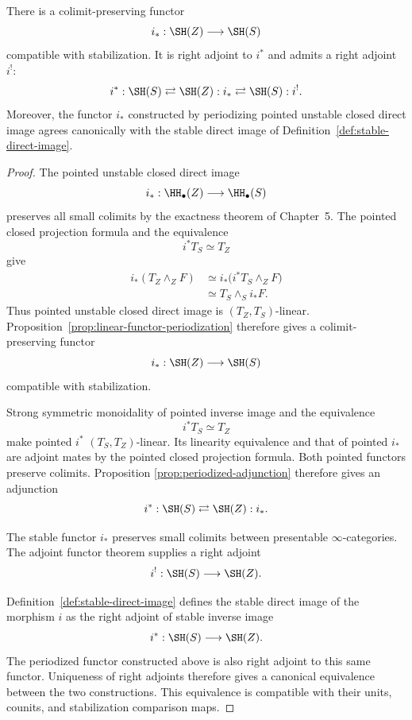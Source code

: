 \begin{proposition}
\label{prop:stable-closed-direct-image}
There is a colimit-preserving functor
\[
    i_*:\SH(Z)\longrightarrow\SH(S)
\]
compatible with stabilization.  It is right adjoint to \(i^*\) and admits a
right adjoint \(i^!\):
\[
    i^*:\SH(S)
    \rightleftarrows
    \SH(Z):i_*
    \rightleftarrows
    \SH(S):i^!.
\]
Moreover, the functor \(i_*\) constructed by periodizing pointed unstable
closed direct image agrees canonically with the stable direct image of
Definition~\ref{def:stable-direct-image}.
\end{proposition}

\begin{proof}
The pointed unstable closed direct image
\[
    i_*:
    \HH_\bullet(Z)
    \longrightarrow
    \HH_\bullet(S)
\]
preserves all small colimits by the exactness theorem of Chapter~5.  The
pointed closed projection formula and the equivalence
\[
    i^*T_S\simeq T_Z
\]
give
\[
\begin{aligned}
    i_*(T_Z\wedge_ZF)
    &\simeq
    i_*\bigl(i^*T_S\wedge_ZF\bigr) \\
    &\simeq
    T_S\wedge_Si_*F.
\end{aligned}
\]
Thus pointed unstable closed direct image is
\((T_Z,T_S)\)-linear.  Proposition~\ref{prop:linear-functor-periodization}
therefore gives a colimit-preserving functor
\[
    i_*:
    \SH(Z)
    \longrightarrow
    \SH(S)
\]
compatible with stabilization.

Strong symmetric monoidality of pointed inverse image and the equivalence
\[
    i^*T_S\simeq T_Z
\]
make pointed \(i^*\) \((T_S,T_Z)\)-linear.  Its linearity equivalence and
that of pointed \(i_*\) are adjoint mates by the pointed closed projection
formula.  Both pointed functors preserve colimits.  Proposition
\ref{prop:periodized-adjunction} therefore gives an adjunction
\[
    i^*:
    \SH(S)
    \rightleftarrows
    \SH(Z):i_*.
\]

The stable functor \(i_*\) preserves small colimits between presentable
\(\infty\)-categories.  The adjoint functor theorem supplies a right adjoint
\[
    i^!:
    \SH(S)
    \longrightarrow
    \SH(Z).
\]

Definition~\ref{def:stable-direct-image} defines the stable direct image of
the morphism \(i\) as the right adjoint of stable inverse image
\[
    i^*:\SH(S)\longrightarrow\SH(Z).
\]
The periodized functor constructed above is also right adjoint to this same
functor.  Uniqueness of right adjoints therefore gives a canonical
equivalence between the two constructions.  This equivalence is compatible
with their units, counits, and stabilization comparison maps.
\end{proof}

